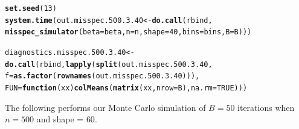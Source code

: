 \documentclass[11pt]{article}\usepackage[]{graphicx}\usepackage[]{color}
\makeatletter
\newcommand{\hlnum}[1]{\textcolor[rgb]{0.686,0.059,0.569}{#1}}%
\newcommand{\hlstd}[1]{\textcolor[rgb]{0.345,0.345,0.345}{#1}}%
\newcommand{\hlkwa}[1]{\textcolor[rgb]{0.161,0.373,0.58}{\textbf{#1}}}%
\newcommand{\hlkwb}[1]{\textcolor[rgb]{0.69,0.353,0.396}{#1}}%
\newcommand{\hlkwc}[1]{\textcolor[rgb]{0.333,0.667,0.333}{#1}}%
\newcommand{\hlkwd}[1]{\textcolor[rgb]{0.737,0.353,0.396}{\textbf{#1}}}%
\newenvironment{kframe}{%
 \def\at@end@of@kframe{}%
 \ifinner\ifhmode%
  \def\at@end@of@kframe{\end{minipage}}%
  \begin{minipage}{\columnwidth}%
 \fi\fi%
 \def\FrameCommand##1{\hskip\@totalleftmargin \hskip-\fboxsep
 \colorbox{shadecolor}{##1}\hskip-\fboxsep
     \hskip-\linewidth \hskip-\@totalleftmargin \hskip\columnwidth}%
 \MakeFramed {\advance\hsize-\width
   \@totalleftmargin\z@ \linewidth\hsize
   \@setminipage}}%
 {\par\unskip\endMakeFramed%
 \at@end@of@kframe}
\newenvironment{knitrout}{}{} %
\makeatother
\begin{document}
\begin{knitrout}
\color{fgcolor}\begin{kframe}
\begin{alltt}
\hlkwd{set.seed}\hlstd{(}\hlnum{13}\hlstd{)}
\hlkwd{system.time}\hlstd{(out.misspec.500.3.40} \hlkwb{<-} \hlkwd{do.call}\hlstd{(rbind,}
  \hlkwd{misspec_simulator}\hlstd{(}\hlkwc{beta} \hlstd{= beta,} \hlkwc{n} \hlstd{= n,} \hlkwc{shape} \hlstd{=} \hlnum{40}\hlstd{,} \hlkwc{bins} \hlstd{= bins,} \hlkwc{B} \hlstd{= B)))}
\end{alltt}


{\ttfamily\noindent\bfseries\color{errorcolor}{\#\# Error in chol.default(crossprod(x) + lambda[j] * diag(v)): the leading minor of order 5 is not positive definite}}

{\ttfamily\noindent\itshape\color{messagecolor}{\#\# Timing stopped at: 0.235 0 0.235}}\begin{alltt}
\hlstd{diagnostics.misspec.500.3.40} \hlkwb{<-} \hlkwd{do.call}\hlstd{(rbind,} \hlkwd{lapply}\hlstd{(}\hlkwd{split}\hlstd{(out.misspec.500.3.40,}
  \hlkwc{f} \hlstd{=} \hlkwd{as.factor}\hlstd{(}\hlkwd{rownames}\hlstd{(out.misspec.500.3.40))),}
  \hlkwc{FUN} \hlstd{=} \hlkwa{function}\hlstd{(}\hlkwc{xx}\hlstd{)} \hlkwd{colMeans}\hlstd{(}\hlkwd{matrix}\hlstd{(xx,} \hlkwc{nrow} \hlstd{= B),} \hlkwc{na.rm} \hlstd{=} \hlnum{TRUE}\hlstd{)))}
\end{alltt}


{\ttfamily\noindent\bfseries\color{errorcolor}{\#\# Error in split(out.misspec.500.3.40, f = as.factor(rownames(out.misspec.500.3.40))): object 'out.misspec.500.3.40' not found}}\end{kframe}
\end{knitrout}


The following performs our Monte Carlo simulation of $B = 50$ iterations 
when $n = 500$ and shape = $60$.
\end{document}
